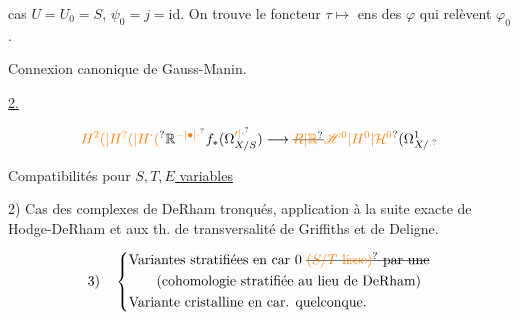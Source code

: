 
cas $U=U_0=S$, $\psi_0=j=\mathrm{id}$. On trouve le foncteur $\tau\longmapsto$ ens des $\varphi$ qui relèvent $\varphi_0$.


Connexion canonique de Gauss-Manin.

\uline{ 2.}


\[
\unsure{H^2(|H^?(|H^{\cdot}(}{\mathbb R}^{\unsure{-|\bullet|\cdot}}f_*(\Omega^{\unsure{\prime|\cdot}}_{X/S})\longrightarrow\deleted{\unsure{R|\mathbb R}}\unsure{\mathscr H^0|H^0|\mathcal H^0}(\Omega^1_{X/\unsure{\cdot}}
\]


  Compatibilités pour \uline{$S,T,E$ variables} 

2) Cas des complexes de DeRham tronqués, application à la suite exacte de Hodge-DeRham et aux th. de transversalité de Griffiths et de Deligne.

\[
3)\quad\left\{\begin{aligned}
&\text{Variantes stratifiées en car 0 \deleted{\unsure{$(S/T$ lisse)} par une}}\\
&\qquad\text{(cohomologie stratifiée au lieu de DeRham)}\\
&\text{Variante cristalline en car. quelconque.}
\end{aligned}\right.
\]

